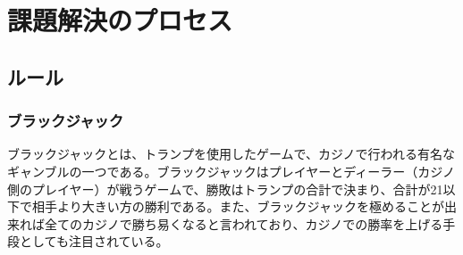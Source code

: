 \chapter{課題解決のプロセス}
\section{ルール}
\subsection{ブラックジャック}
ブラックジャックとは、トランプを使用したゲームで、カジノで行われる有名なギャンブルの一つである。ブラックジャックはプレイヤーとディーラー（カジノ側のプレイヤー）が戦うゲームで、勝敗はトランプの合計で決まり、合計が21以下で相手より大きい方の勝利である。また、ブラックジャックを極めることが出来れば全てのカジノで勝ち易くなると言われており、カジノでの勝率を上げる手段としても注目されている。

